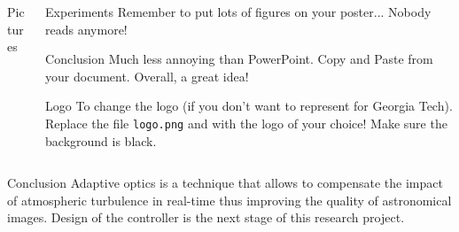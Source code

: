 \begin{frame}{}
\begin{columns}[t]
\begin{column}{0.32\linewidth}
      \begin{block}{Pictures}
      \end{block}

    \end{column}%

    \begin{column}{0.32\linewidth}

      \begin{block}{Experiments}
        Remember to put lots of figures on your poster... Nobody reads anymore!
      \end{block}

      \begin{block}{Conclusion}
        Much less annoying than PowerPoint.  Copy and Paste from your
        document. Overall, a great idea!
      \end{block}

      \begin{block}{Logo}
        To change the logo (if you don't want to represent for Georgia Tech).
        Replace the file {\tt logo.png} and with the logo of your choice!
        Make sure the background is black.
      \end{block}

    \end{column}%

  \end{columns}

	\begin{block}{Conclusion} \justifying
Adaptive optics is a technique that allows to compensate the impact of atmospheric turbulence in real-time thus improving the quality of astronomical images. Design of the controller is the next stage of this research project.
	\end{block}%

\end{frame}

